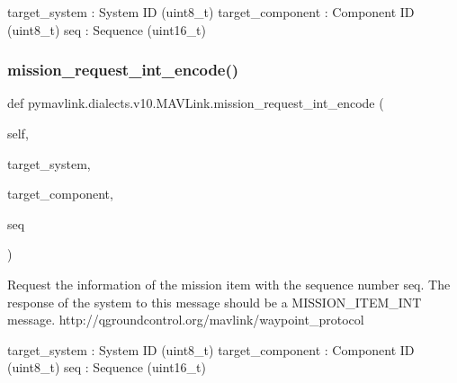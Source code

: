 \begin{DoxyVerb}
\begin{DoxyVerb}
\begin{DoxyVerb}
\begin{DoxyVerb}
\begin{DoxyVerb}
target_system             : System ID (uint8_t)
target_component          : Component ID (uint8_t)
seq                       : Sequence (uint16_t)\end{DoxyVerb}
 \mbox{\label{classpymavlink_1_1dialects_1_1v10_1_1MAVLink_a6498818786001a6a083502b8c237da21}} 
\subsubsection{\texorpdfstring{mission\+\_\+request\+\_\+int\+\_\+encode()}{mission\_request\_int\_encode()}}
{\footnotesize\ttfamily def pymavlink.\+dialects.\+v10.\+M\+A\+V\+Link.\+mission\+\_\+request\+\_\+int\+\_\+encode (\begin{DoxyParamCaption}\item[{}]{self,  }\item[{}]{target\+\_\+system,  }\item[{}]{target\+\_\+component,  }\item[{}]{seq }\end{DoxyParamCaption})}

\begin{DoxyVerb}Request the information of the mission item with the sequence number
seq. The response of the system to this message should
be a MISSION_ITEM_INT message.
http://qgroundcontrol.org/mavlink/waypoint_protocol

target_system             : System ID (uint8_t)
target_component          : Component ID (uint8_t)
seq                       : Sequence (uint16_t)\end{DoxyVerb}
 \mbox{\label{classpymavlink_1_1dialects_1_1v10_1_1MAVLink_a52f3aeb73a023f06669b30cc4ddc93e2}} 

\end{DoxyVerb}
\end{DoxyVerb}
\end{DoxyVerb}
\end{DoxyVerb}
